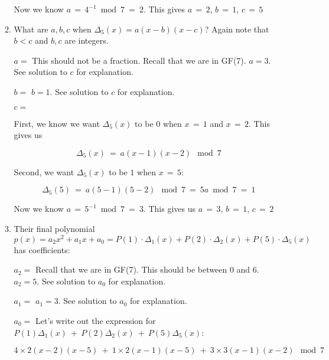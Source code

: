\documentclass[11pt, preview]{standalone} %
\begin{document}
\begin{enumerate}
\begin{enumerate}
\begin{Freeform}{5}
 Now we know $a\, =\, 4^{-1} \bmod 7\ =\ 2$. This gives $a\, =\, 2$, $b\, =\, 1$, $c\, =\, 5$
 \end{Freeform}
 
  \item What are $a,b,c$ when $\Delta_5(x) = a(x-b)(x-c)$? Again note that $b < c$ and $b,c$ are integers.
  \begin{Freeform}{3}
 $a = $
 \Hint This should not be a fraction. Recall that we are in GF(7).
 \Solution $a = 3$. See solution to $c$ for explanation.
 \end{Freeform}
  \begin{Freeform}{1}
 $b = $
 \Solution $b = 1$. See solution to $c$ for explanation.
 \end{Freeform}
  \begin{Freeform}{2}
 $c = $

 \Solution First, we know we want $\Delta_5(x)$ to be $0$ when $x\, =\, 1$ and $x\, =\, 2$. This gives us 

 $$\Delta_5(x)\ =\ a(x - 1)(x - 2)\ \bmod 7$$

 Second, we want $\Delta_5(x)$ to be $1$ when $x\, =\, 5$:

 $$\Delta_5(5)\ =\ a(5 - 1)(5 - 2)\ \bmod 7\ =\ 5a \bmod 7\ =\ 1$$

 Now we know $a\, =\, 5^{-1} \bmod 7\ =\ 3$. This gives us $a\, =\, 3$, $b\, =\, 1$, $c\, =\, 2$
 \end{Freeform}

 
 \item Their final polynomial $p(x) = a_2 x^2 + a_1 x + a_0 = P(1)\cdot\Delta_1(x) + P(2)\cdot\Delta_2(x) + P(5)\cdot\Delta_5(x)$ has coefficients:
  \begin{Freeform}{5}
 $a_2 = $
 \Hint Recall that we are in GF(7). This should be between $0$ and $6$.
 \Solution $a_2 = 5$. See solution to $a_0$ for explanation.
 \end{Freeform}
  \begin{Freeform}{3}
 $a_1 = $
 \Solution $a_1 = 3$. See solution to $a_0$ for explanation.
 \end{Freeform}
  \begin{Freeform}{3}
 $a_0 = $
 \Solution Let's write out the expression for $P(1)\Delta_1(x)\ +\ P(2)\Delta_2(x)\ +\ P(5)\Delta_5(x)$:

 $$4 \times 2(x - 2)(x - 5)\ +\ 1 \times 2(x - 1)(x - 5)\ +\ 3 \times 3(x - 1)(x - 2)\ \bmod 7$$


\end{Freeform}
\end{enumerate}
\end{enumerate}
\end{document}
